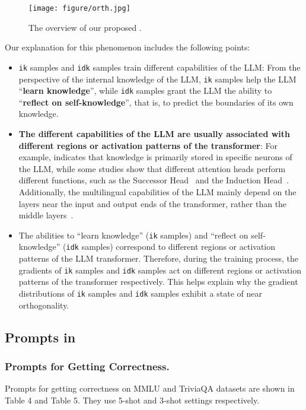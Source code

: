 \begin{figure*}[t]
  \centering
  \texttt{[image: figure/orth.jpg]}
  \caption{The overview of our proposed \M.
  }
  \label{fig:orth}
\end{figure*}

Our explanation for this phenomenon includes the following points:
\begin{itemize}[leftmargin=*]
    \item \texttt{ik} samples and \texttt{idk} samples train different capabilities of the LLM: From the perspective of the internal knowledge of the LLM, \texttt{ik} samples help the LLM ``\textbf{learn knowledge}'', while \texttt{idk} samples grant the LLM the ability to ``\textbf{reflect on self-knowledge}'', that is, to predict the boundaries of its own knowledge.
    \item \textbf{The different capabilities of the LLM are usually associated with different regions or activation patterns of the transformer}: For example, \citep{dai2022knowledgeneuronspretrainedtransformers,yu2024neuronlevelknowledgeattributionlarge} indicates that knowledge is primarily stored in specific neurons of the LLM, while some studies show that different attention heads perform different functions, such as the Successor Head~\cite{gould2023successorheadsrecurringinterpretable} and the Induction Head~\cite{ren2024identifyingsemanticinductionheads}. Additionally, the multilingual capabilities of the LLM mainly depend on the layers near the input and output ends of the transformer, rather than the middle layers~\cite{wendler2024llamasworkenglishlatent}.
    \item The abilities to ``learn knowledge'' (\texttt{ik} samples) and ``reflect on self-knowledge'' (\texttt{idk} samples) correspond to different regions or activation patterns of the LLM transformer. Therefore, during the training process, the gradients of \texttt{ik} samples and \texttt{idk} samples act on different regions or activation patterns of the transformer respectively. This helps explain why the gradient distributions of \texttt{ik} samples and \texttt{idk} samples exhibit a state of near orthogonality.
\end{itemize}

\subsection{Prompts in \M}
\label{app:imple}
\subsubsection{Prompts for Getting Correctness.}
Prompts for getting correctness on MMLU and TriviaQA datasets are shown in Table 4 and Table 5. They use 5-shot and 3-shot settings respectively.

